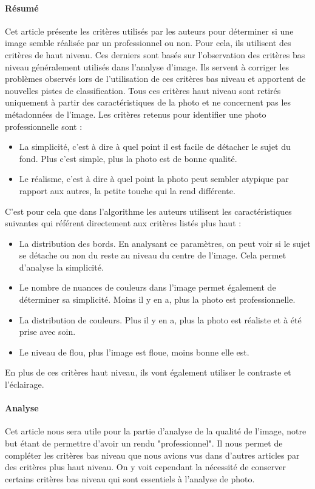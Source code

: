 \documentclass[11pt, french]{report-rd-info}
\begin{document}
\paragraph{Résumé}
Cet article présente les critères utilisés par les auteurs pour déterminer si une image semble réalisée par un professionnel ou non. Pour cela, ils utilisent des critères de haut niveau. Ces derniers sont basés sur l'observation des critères bas niveau généralement utilisés dans l'analyse d'image. Ils servent à corriger les problèmes observés lors de l'utilisation de ces critères bas niveau et apportent de nouvelles pistes de classification.
Tous ces critères haut niveau sont retirés uniquement à partir des caractéristiques de la photo et ne concernent pas les métadonnées de l'image.
Les critères retenus pour identifier une photo professionnelle sont :
\begin{itemize}
\item La simplicité, c'est à dire à quel point il est facile de détacher le sujet du fond. Plus c'est simple, plus la photo est de bonne qualité.
\item Le réalisme, c'est à dire à quel point la photo peut sembler atypique par rapport aux autres, la petite touche qui la rend différente.
\end{itemize}
C'est pour cela que dans l'algorithme les auteurs utilisent les caractéristiques suivantes qui référent directement aux critères listés plus haut :
\begin{itemize}
\item La distribution des bords. En analysant ce paramètres, on peut voir si le sujet se détache ou non du reste au niveau du centre de l'image. Cela permet d'analyse la simplicité.
\item Le nombre de nuances de couleurs dans l'image permet également de déterminer sa simplicité. Moins il y en a, plus la photo est professionnelle.
\item La distribution de couleurs. Plus il y en a, plus la photo est réaliste et à été prise avec soin.
\item Le niveau de flou, plus l'image est floue, moins bonne elle est.
\end{itemize}
En plus de ces critères haut niveau, ils vont également utiliser le contraste et l'éclairage.
\paragraph{Analyse}
Cet article nous sera utile pour la partie d'analyse de la qualité de l'image, notre but étant de permettre d'avoir un rendu "professionnel". Il nous permet de compléter les critères bas niveau que nous avions vus dans d'autres articles par des critères plus haut niveau. On y voit cependant la nécessité de conserver certains critères bas niveau qui sont essentiels à l'analyse de photo.
\end{document}
